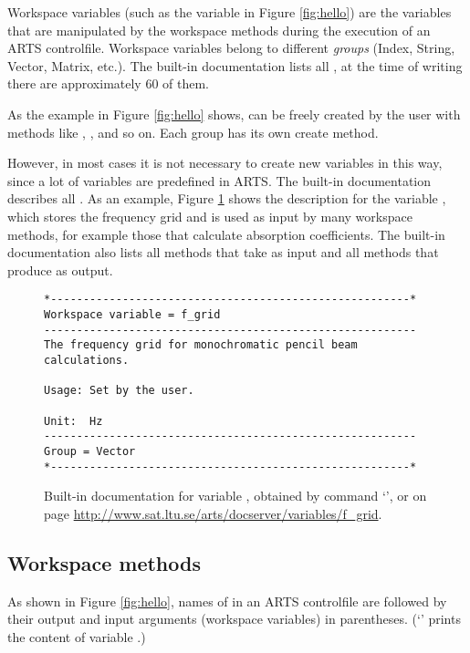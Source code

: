 Workspace variables (such as the variable  in Figure
\ref{fig:hello}) are the variables that are manipulated by the
workspace methods during the execution of an ARTS
controlfile. Workspace variables belong to different \emph{groups}
(Index, String, Vector, Matrix, etc.). The built-in documentation
lists all , at the time of writing there are
approximately 60 of them.

As the example in Figure \ref{fig:hello} shows,  can be freely created by the user with methods like
, , and so on.
Each group has its own create method.

However, in most cases it is not necessary to create new variables in
this way, since a lot of variables are predefined in ARTS. The
built-in documentation describes all . As an example, Figure \ref{fig:f_grid} shows the
description for the variable , which stores the
frequency grid and is used as input by many workspace methods, for
example those that calculate absorption coefficients. The built-in
documentation also lists all methods that take  as
input and all methods that produce  as output.

\begin{figure}
\footnotesize
\begin{lstlisting}
*-------------------------------------------------------*
Workspace variable = f_grid
---------------------------------------------------------
The frequency grid for monochromatic pencil beam 
calculations.

Usage: Set by the user.
 
Unit:  Hz
---------------------------------------------------------
Group = Vector
*-------------------------------------------------------*
\end{lstlisting}
\caption{Built-in documentation for variable , obtained by
  command `', or on page
  \url{http://www.sat.ltu.se/arts/docserver/variables/f_grid}.} 
\label{fig:f_grid}
\end{figure}

\subsection{Workspace methods}
%
As shown in Figure \ref{fig:hello}, names of  in an ARTS
controlfile are followed by their output and input arguments (workspace
variables) in parentheses. (`' prints the content of variable
.)

